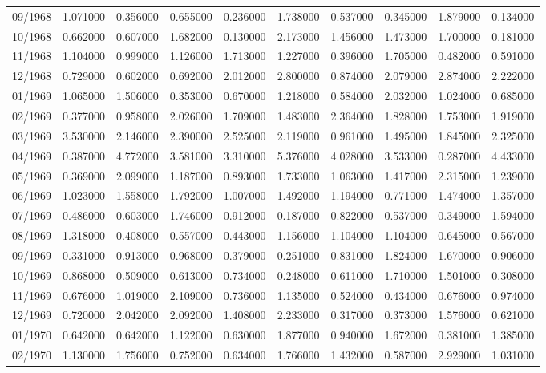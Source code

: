 \begin{tabular}{lrrrrrrrrr}
09/1968 & 1.071000 & 0.356000 & 0.655000 & 0.236000 & 1.738000 & 0.537000 & 0.345000 & 1.879000 & 0.134000 \\
10/1968 & 0.662000 & 0.607000 & 1.682000 & 0.130000 & 2.173000 & 1.456000 & 1.473000 & 1.700000 & 0.181000 \\
11/1968 & 1.104000 & 0.999000 & 1.126000 & 1.713000 & 1.227000 & 0.396000 & 1.705000 & 0.482000 & 0.591000 \\
12/1968 & 0.729000 & 0.602000 & 0.692000 & 2.012000 & 2.800000 & 0.874000 & 2.079000 & 2.874000 & 2.222000 \\
01/1969 & 1.065000 & 1.506000 & 0.353000 & 0.670000 & 1.218000 & 0.584000 & 2.032000 & 1.024000 & 0.685000 \\
02/1969 & 0.377000 & 0.958000 & 2.026000 & 1.709000 & 1.483000 & 2.364000 & 1.828000 & 1.753000 & 1.919000 \\
03/1969 & 3.530000 & 2.146000 & 2.390000 & 2.525000 & 2.119000 & 0.961000 & 1.495000 & 1.845000 & 2.325000 \\
04/1969 & 0.387000 & 4.772000 & 3.581000 & 3.310000 & 5.376000 & 4.028000 & 3.533000 & 0.287000 & 4.433000 \\
05/1969 & 0.369000 & 2.099000 & 1.187000 & 0.893000 & 1.733000 & 1.063000 & 1.417000 & 2.315000 & 1.239000 \\
06/1969 & 1.023000 & 1.558000 & 1.792000 & 1.007000 & 1.492000 & 1.194000 & 0.771000 & 1.474000 & 1.357000 \\
07/1969 & 0.486000 & 0.603000 & 1.746000 & 0.912000 & 0.187000 & 0.822000 & 0.537000 & 0.349000 & 1.594000 \\
08/1969 & 1.318000 & 0.408000 & 0.557000 & 0.443000 & 1.156000 & 1.104000 & 1.104000 & 0.645000 & 0.567000 \\
09/1969 & 0.331000 & 0.913000 & 0.968000 & 0.379000 & 0.251000 & 0.831000 & 1.824000 & 1.670000 & 0.906000 \\
10/1969 & 0.868000 & 0.509000 & 0.613000 & 0.734000 & 0.248000 & 0.611000 & 1.710000 & 1.501000 & 0.308000 \\
11/1969 & 0.676000 & 1.019000 & 2.109000 & 0.736000 & 1.135000 & 0.524000 & 0.434000 & 0.676000 & 0.974000 \\
12/1969 & 0.720000 & 2.042000 & 2.092000 & 1.408000 & 2.233000 & 0.317000 & 0.373000 & 1.576000 & 0.621000 \\
01/1970 & 0.642000 & 0.642000 & 1.122000 & 0.630000 & 1.877000 & 0.940000 & 1.672000 & 0.381000 & 1.385000 \\
02/1970 & 1.130000 & 1.756000 & 0.752000 & 0.634000 & 1.766000 & 1.432000 & 0.587000 & 2.929000 & 1.031000 \\

\end{tabular}
